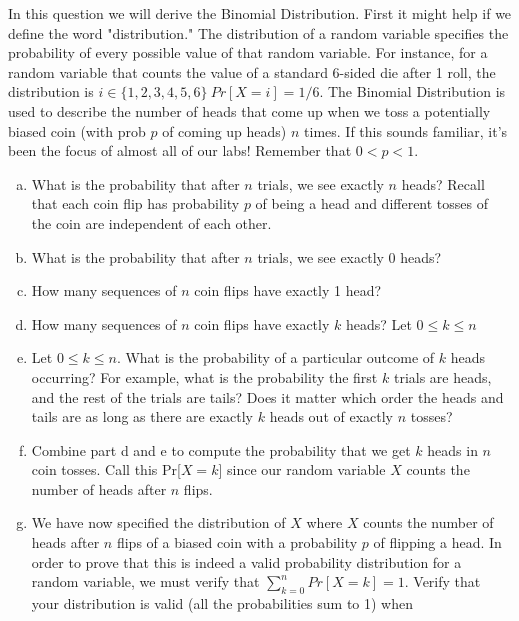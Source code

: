 \documentclass[]{article}
\begin{document}
\begin{qunlist}
In this question we will derive the Binomial Distribution. First it might help if we define the word "distribution." The distribution of a random variable specifies the probability of every possible value of that random variable. For instance, for a random variable that counts the value of a standard 6-sided die after 1 roll, the distribution is $i \in \{1,2,3,4,5,6\} \ Pr[X = i] = 1/6$. %
The Binomial Distribution is used to describe the number of heads that
come up when we toss a potentially biased coin (with prob $p$ of
coming up heads) $n$ times. If this sounds familiar, it's been the focus of almost all of our labs! Remember that $0 < p < 1$.
\begin{enumerate}[a)]
\qpart
\item What is the probability that after $n$ trials, we see exactly
  $n$ heads? Recall that each coin flip has probability $p$ of being a
  head and different tosses of the coin are independent of each other.
\qpart
\item What is the probability that after $n$ trials, we see exactly $0$ heads?
\qpart
\item How many sequences of $n$ coin flips have exactly 1 head?
\qpart
\item How many sequences of $n$ coin flips have exactly $k$ heads? Let  $0 \leq k \leq n$ 
\qpart
\item  Let  $0 \leq k \leq n$. What is the probability of a particular
  outcome of $k$ heads occurring? For example, what is the probability
  the first $k$ trials are heads, and the rest of the trials are
  tails? Does it matter which order the heads and tails are as long as
  there are exactly $k$ heads out of exactly $n$ tosses?
\qpart
\item Combine part d and e to compute the probability that we get $k$
  heads in $n$ coin tosses. Call this Pr[$X = k$] since our random variable $X$ counts the number of heads after $n$ flips. 
\qpart
\item We have now specified the distribution of $X$ where $X$ counts
  the number of heads after $n$ flips of a biased coin with a
  probability $p$ of flipping a head. In order to prove that this is
  indeed a valid probability distribution for a random variable, we
  must verify that $\sum\nolimits_{k=0}^n Pr[X=k] = 1$. Verify that
  your distribution is valid (all the probabilities sum to 1) when

\end{enumerate}
\end{qunlist}
\end{document}
